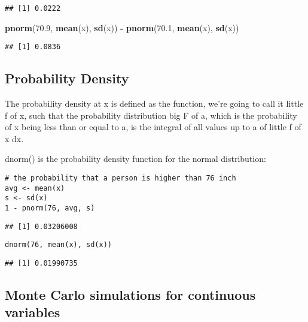 \documentclass[
]{article}
\newenvironment{Shaded}{\begin{snugshade}}{\end{snugshade}}
\newcommand{\FloatTok}[1]{\textcolor[rgb]{0.00,0.00,0.81}{#1}}
\newcommand{\KeywordTok}[1]{\textcolor[rgb]{0.13,0.29,0.53}{\textbf{#1}}}
\newcommand{\NormalTok}[1]{#1}
\newcommand{\OperatorTok}[1]{\textcolor[rgb]{0.81,0.36,0.00}{\textbf{#1}}}
\newcommand{\StringTok}[1]{\textcolor[rgb]{0.31,0.60,0.02}{#1}}
\begin{document}
\begin{verbatim}
## [1] 0.0222
\end{verbatim}

\begin{Shaded}
\begin{Highlighting}[]
\KeywordTok{pnorm}\NormalTok{(}\FloatTok{70.9}\NormalTok{, }\KeywordTok{mean}\NormalTok{(x), }\KeywordTok{sd}\NormalTok{(x)) }\OperatorTok{{-}}\StringTok{ }\KeywordTok{pnorm}\NormalTok{(}\FloatTok{70.1}\NormalTok{, }\KeywordTok{mean}\NormalTok{(x), }\KeywordTok{sd}\NormalTok{(x))}
\end{Highlighting}
\end{Shaded}

\begin{verbatim}
## [1] 0.0836
\end{verbatim}

\hypertarget{probability-density}{%
\subsection{Probability Density}\label{probability-density}}

The probability density at x is defined as the function, we're going to
call it little f of x, such that the probability distribution big F of
a, which is the probability of x being less than or equal to a, is the
integral of all values up to a of little f of x dx.

dnorm() is the probability density function for the normal distribution:

\begin{verbatim}
# the probability that a person is higher than 76 inch
avg <- mean(x)
s <- sd(x)
1 - pnorm(76, avg, s)
\end{verbatim}

\begin{verbatim}
## [1] 0.03206008
\end{verbatim}

\begin{verbatim}
dnorm(76, mean(x), sd(x))
\end{verbatim}

\begin{verbatim}
## [1] 0.01990735
\end{verbatim}

\hypertarget{monte-carlo-simulations-for-continuous-variables}{%
\subsection{Monte Carlo simulations for continuous
variables}\label{monte-carlo-simulations-for-continuous-variables}}
\end{document}
